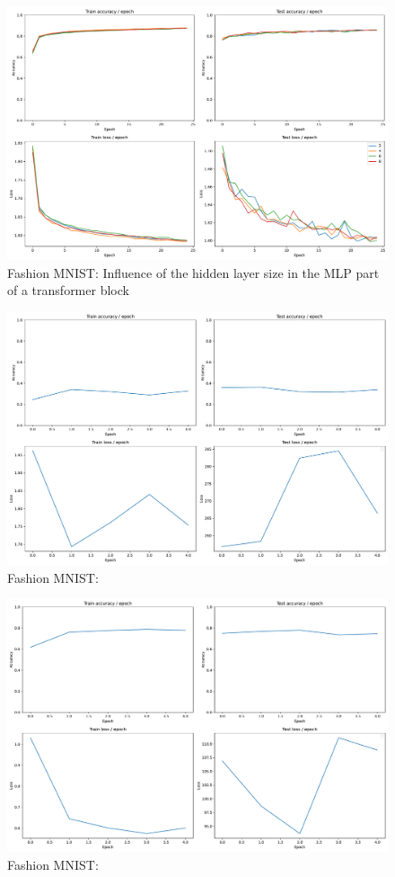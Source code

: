 \begin{figure}[H]
    \centering
    \includegraphics*[width=\textwidth]{figs/Transformers/fashion-MNIST/mlp_ratio_influence_25.pdf}
    \caption{Fashion MNIST: Influence of the hidden layer size in the MLP part of a transformer block}
    \label{fig:fashion:mlp_ratio_influence}
\end{figure}

\begin{figure}[H]
    \centering
    \includegraphics*[width=\textwidth]{figs/Transformers/fashion-MNIST/stats_vit.pdf}
    \caption{Fashion MNIST: }
    \label{fig:fashion:stats_vit}
\end{figure}

\begin{figure}[H]
    \centering
    \includegraphics*[width=\textwidth]{figs/Transformers/fashion-MNIST/stats_vit_pretrained.pdf}
    \caption{Fashion MNIST: }
    \label{fig:fashion:stats_vit_pretrained}
\end{figure}